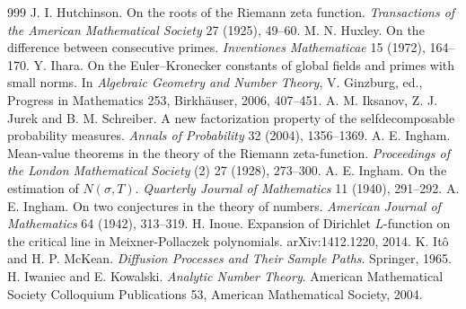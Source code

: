 \begin{thebibliography}{999}
 J. I. Hutchinson. On the roots of the Riemann zeta function. \emph{Transactions of the American Mathematical Society} 27 (1925), 49--60.
 M. N. Huxley. On the difference between consecutive primes. \emph{Inventiones Mathematicae} 15 (1972), 164--170.
 Y. Ihara. On the Euler--Kronecker constants of global fields and primes with small norms. In \emph{Algebraic Geometry and Number Theory}, V. Ginzburg, ed., Progress in Mathematics 253, Birkh\"auser, 2006, 407--451.
 A. M. Iksanov, Z. J. Jurek and B. M. Schreiber. A new factorization property of the selfdecomposable probability measures. \emph{Annals of Probability} 32 (2004), 1356--1369.
 A. E. Ingham. Mean-value theorems in the theory of the Riemann zeta-function. \emph{Proceedings of the London Mathematical Society} (2) 27 (1928), 273--300.
 A. E. Ingham. On the estimation of $N(\sigma,T)$. \emph{Quarterly Journal of Mathematics} 11 (1940), 291--292.
 A. E. Ingham. On two conjectures in the theory of numbers. \emph{American Journal of Mathematics} 64 (1942), 313--319.
 H. Inoue. Expansion of Dirichlet $L$-function on the critical line in Meixner-Pollaczek polynomials. arXiv:1412.1220, 2014.
 K. It\^o and H. P. McKean. \emph{Diffusion Processes and Their Sample Paths}. Springer, 1965.
 H. Iwaniec and E. Kowalski. \emph{Analytic Number Theory}. American Mathematical Society Colloquium Publications 53, American Mathematical Society, 2004.

\end{thebibliography}
